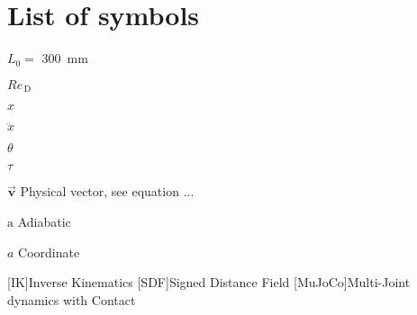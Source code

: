 \chapter{List of symbols}

\begin{Nomencl}[1cm]
    \item[$L_0 = $] \qty{300}{mm}

    \item[$\mathit{Re}_\mathrm{\,D}$]
    \item[$x$]         
    \item[$\ddot{x}$]  \\
    
    \item[$\theta$]    
    \item[$\tau$]      

    \item[$\overrightarrow{\bm{v}}$] Physical vector, see equation ...

    \item[$\mathrm{a}$] Adiabatic
    \item[$a$]          Coordinate

\end{Nomencl}

    \begin{acronym}[MMIIII]
        [IK]{Inverse Kinematics}
        [SDF]{Signed Distance Field}
        [MuJoCo]{Multi-Joint dynamics with Contact}
    \end{acronym}    

